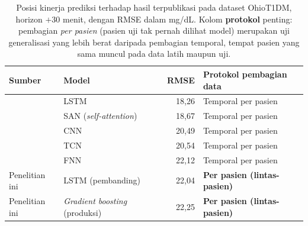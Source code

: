 \begin{table}[htbp]
\centering
\caption{Posisi kinerja prediksi terhadap hasil terpublikasi pada dataset OhioT1DM, horizon $+30$ menit, dengan RMSE dalam mg/dL. Kolom \textbf{protokol} penting: pembagian \emph{per pasien} (pasien uji tak pernah dilihat model) merupakan uji generalisasi yang lebih berat daripada pembagian temporal, tempat pasien yang sama muncul pada data latih maupun uji.}
\label{tab:literatur}
\small
\begin{tabularx}{\textwidth}{@{}lLrL@{}}
\toprule
\textbf{Sumber} & \textbf{Model} & \textbf{RMSE} & \textbf{Protokol pembagian data} \\
\midrule
\textcite{ghimire2024} & LSTM   & 18,26 & Temporal per pasien \\
\textcite{ghimire2024} & SAN (\emph{self-attention}) & 18,67 & Temporal per pasien \\
\textcite{ghimire2024} & CNN    & 20,49 & Temporal per pasien \\
\textcite{ghimire2024} & TCN    & 20,54 & Temporal per pasien \\
\textcite{ghimire2024} & FNN    & 22,12 & Temporal per pasien \\
\midrule
Penelitian ini & LSTM (pembanding) & 22,04 & \textbf{Per pasien (lintas-pasien)} \\
Penelitian ini & \emph{Gradient boosting} (produksi) & 22,25 & \textbf{Per pasien (lintas-pasien)} \\
\bottomrule
\end{tabularx}
\end{table}
